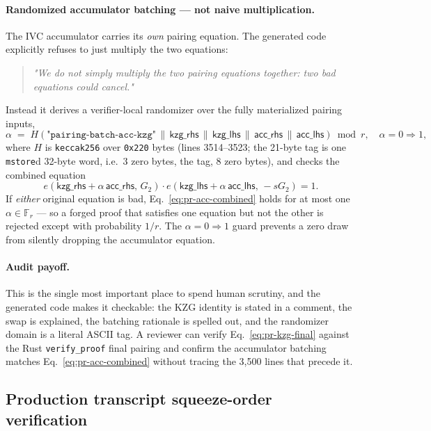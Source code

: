 \paragraph{Randomized accumulator batching --- not naive multiplication.}
The IVC accumulator carries its \emph{own} pairing equation. The
generated code explicitly refuses to just multiply the two equations:
\begin{quote}\small
\emph{"We do not simply multiply the two pairing equations together:
two bad equations could cancel."}
\end{quote}
Instead it derives a verifier-local randomizer over the fully
materialized pairing inputs,
\begin{equation}
\alpha \;=\; H(\texttt{"pairing-batch-acc-kzg"} \,\|\, \mathsf{kzg\_rhs} \,\|\, \mathsf{kzg\_lhs} \,\|\, \mathsf{acc\_rhs} \,\|\, \mathsf{acc\_lhs}) \bmod r,\quad \alpha{=}0\!\Rightarrow\!1,
\label{eq:pr-acc-alpha}
\end{equation}
where $H$ is \texttt{keccak256} over \texttt{0x220} bytes (lines
3514--3523; the 21-byte tag is one \texttt{mstore}d 32-byte word, i.e.\ 3
zero bytes, the tag, 8 zero bytes), and checks the combined equation
\begin{equation}
e(\mathsf{kzg\_rhs}+\alpha\,\mathsf{acc\_rhs},\,G_2)\cdot
e(\mathsf{kzg\_lhs}+\alpha\,\mathsf{acc\_lhs},\,-sG_2)=1.
\label{eq:pr-acc-combined}
\end{equation}
If \emph{either} original equation is bad, Eq.~\eqref{eq:pr-acc-combined}
holds for at most one $\alpha\in\mathbb{F}_r$ --- so a forged proof
that satisfies one equation but not the other is rejected except with
probability $1/r$. The $\alpha{=}0\!\Rightarrow\!1$ guard prevents a
zero draw from silently dropping the accumulator equation.

\paragraph{Audit payoff.} This is the single most important place to
spend human scrutiny, and the generated code makes it checkable: the
KZG identity is stated in a comment, the swap is explained, the
batching rationale is spelled out, and the randomizer domain is a
literal ASCII tag. A reviewer can verify Eq.~\eqref{eq:pr-kzg-final}
against the Rust \texttt{verify\_proof} final pairing and confirm the
accumulator batching matches Eq.~\eqref{eq:pr-acc-combined} without
tracing the 3{,}500 lines that precede it.

\subsection{Production transcript squeeze-order verification}
\label{sec:pr-transcript-order}

